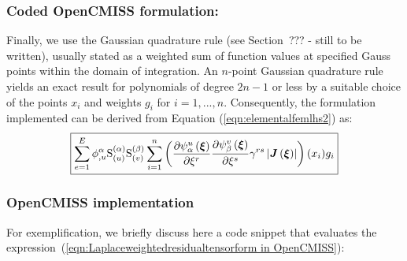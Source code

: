 \subsubsection{Coded OpenCMISS formulation:}
Finally, we use the Gaussian quadrature rule (see Section~??? - still to be written), 
usually stated as a weighted sum of function values at specified Gauss points within the domain of integration. An $n$-point Gaussian quadrature rule yields an exact result for polynomials of degree $2n-1$ or less by a suitable choice of the points $x_i$ and weights $g_i$ for $i = 1,...,n$. Consequently, the formulation implemented can be derived from Equation (\ref{eqn:elementalfemlhs2}) as: 
\begin{equation}
  \boxed{
  \dsum_{e=1}^{E}\nodedof{\phi}{\alpha}{u}\gsf{(\alpha)}{(u)} \gsf{(\beta)}{(v)}
  \dsum_{i=1}^{n}
  \left(\delby{\gbfn{\alpha}{u}{\vect{\xi}}}{\xi^{r}}
  \delby{\gbfn{\beta}{v}{\vect{\xi}}}{\xi^{s}}\gamma^{rs}\abs{\fnof{\matr{J}}{\vect{\xi}}}
  \right)(x_i)g_i
  }
  \label{eqn:Laplaceweightedresidualtensorform in OpenCMISS}
\end{equation}


\newpage
\subsubsection{OpenCMISS implementation}

For exemplification, we briefly discuss here a code snippet
that evaluates the expression~(\ref{eqn:Laplaceweightedresidualtensorform in OpenCMISS}):





